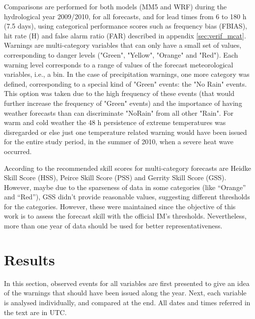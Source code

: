 Comparisons are performed for both models (MM5 and WRF) during the hydrological year 2009/2010, for all forecasts, and for lead times from 6 to 180 h (7.5 days), using categorical performance scores such as frequency bias (FBIAS), hit rate (H) and false alarm ratio (FAR) described in appendix \ref{sec:verif_mcat}. Warnings are multi-category variables that can only have a small set of values, corresponding to danger levels ("Green", "Yellow", "Orange" and "Red"). Each warning level corresponds to a range of values of the forecast meteorological variables, i.e., a bin. In the case of precipitation warnings, one more category was defined, corresponding to a special kind of "Green" events: the "No Rain" events. This option was taken due to the high frequency of these events (that would further increase the frequency of "Green" events) and the importance of having weather forecasts than can discriminate "NoRain" from all other "Rain". For warm and cold weather the 48 h persistence of extreme temperatures was disregarded or else just one temperature related warning would have been issued for the entire study period, in the summer of 2010, when a severe heat wave occurred.

According to \cite{Jolliffe2003} the recommended skill scores for multi-category forecasts are Heidke Skill Score (HSS), Peirce Skill Score (PSS) and Gerrity Skill Score (GSS). However, maybe due to the sparseness of data in some categories (like ``Orange'' and ``Red''), GSS didn't provide reasonable values, suggesting different thresholds for the categories. However, these were maintained since the objective of this work is to assess the forecast skill with the official IM's thresholds. Nevertheless, more than one year of data should be used for better representativeness. 

\section{Results}

In this section, observed events for all variables are first presented to give an idea of the warnings that should have been issued along the year. Next, each variable is analysed individually, and compared at the end. All dates and times referred in the text are in UTC.

